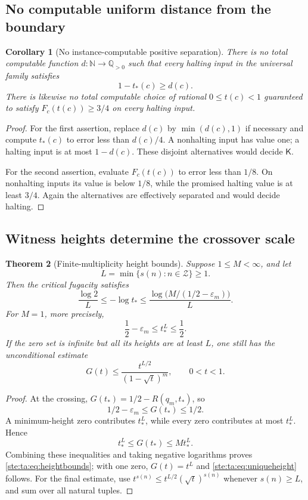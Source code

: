 \documentclass[11pt,letterpaper]{article}
\newtheorem{theorem}{Theorem}[section]
\newtheorem{corollary}[theorem]{Corollary}
\theoremstyle{definition}
\theoremstyle{remark}
\newcommand{\N}{\mathbb N}
\newcommand{\epsm}{\varepsilon_m}
\begin{document}
\subsection{No computable uniform distance from the boundary}
\begin{corollary}[No instance-computable positive separation]\label{ste:ta:cor:separation}
There is no total computable function $d:\N\to\mathbb Q_{>0}$ such that every halting input in the universal family satisfies
\[
1-t_*(c)\ge d(c).
\]
There is likewise no total computable choice of rational $0\le t(c)<1$ guaranteed to satisfy $F_c(t(c))\ge3/4$ on every halting input.
\end{corollary}
\begin{proof}
For the first assertion, replace $d(c)$ by $\min(d(c),1)$ if necessary and compute $t_*(c)$ to error less than $d(c)/4$. A nonhalting input has value one; a halting input is at most $1-d(c)$. These disjoint alternatives would decide $\mathsf K$.

For the second assertion, evaluate $F_c(t(c))$ to error less than $1/8$. On nonhalting inputs its value is below $1/8$, while the promised halting value is at least $3/4$. Again the alternatives are effectively separated and would decide halting.
\end{proof}

\subsection{Witness heights determine the crossover scale}
\begin{theorem}[Finite-multiplicity height bounds]\label{ste:ta:thm:height}
Suppose $1\le M<\infty$, and let
\[
L=\min\{s(n):n\in\mathcal Z\}\ge1.
\]
Then the critical fugacity satisfies
\begin{equation}\label{ste:ta:eq:heightbounds}
\frac{\log2}{L}\le-\log t_*\le
\frac{\log\bigl(M/(1/2-\epsm)\bigr)}{L}.
\end{equation}
For $M=1$, more precisely,
\begin{equation}\label{ste:ta:eq:uniqueheight}
\frac12-\epsm\le t_*^L\le\frac12.
\end{equation}
If the zero set is infinite but all its heights are at least $L$, one still has the unconditional estimate
\begin{equation}\label{ste:ta:eq:infiniteheight}
G(t)\le\frac{t^{L/2}}{(1-\sqrt t)^m},\qquad 0<t<1.
\end{equation}
\end{theorem}
\begin{proof}
At the crossing, $G(t_*)=1/2-R(q_m,t_*)$, so
\[
1/2-\epsm\le G(t_*)\le1/2.
\]
A minimum-height zero contributes $t_*^L$, while every zero contributes at most $t_*^L$. Hence
\[
t_*^L\le G(t_*)\le M t_*^L.
\]
Combining these inequalities and taking negative logarithms proves \eqref{ste:ta:eq:heightbounds}; with one zero, $G(t)=t^L$ and \eqref{ste:ta:eq:uniqueheight} follows. For the final estimate, use $t^{s(n)}\le t^{L/2}(\sqrt t)^{s(n)}$ whenever $s(n)\ge L$, and sum over all natural tuples.
\end{proof}
\end{document}
